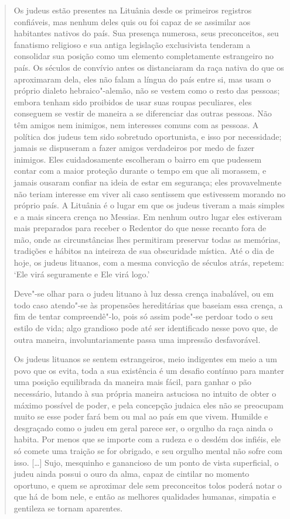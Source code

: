 \begin{quote}
Os judeus estão presentes na Lituânia desde os primeiros registros
confiáveis, mas nenhum deles quis ou foi capaz de se assimilar aos
habitantes nativos do país. Sua presença numerosa, seus preconceitos,
seu fanatismo religioso e sua antiga legislação exclusivista tenderam a
consolidar sua posição como um elemento completamente estrangeiro no
país. Os séculos de convívio antes os distanciaram da raça nativa do que
os aproximaram dela, eles não falam a língua do país entre si, mas usam
o próprio dialeto hebraico"-alemão, não se vestem como o resto das
pessoas; embora tenham sido proibidos de usar suas roupas peculiares,
eles conseguem se vestir de maneira a se diferenciar das outras pessoas.
Não têm amigos nem inimigos, nem interesses comuns com as pessoas. A
política dos judeus tem sido sobretudo oportunista, e isso por
necessidade; jamais se dispuseram a fazer amigos verdadeiros por medo de
fazer inimigos. Eles cuidadosamente escolheram o bairro em que pudessem
contar com a maior proteção durante o tempo em que ali morassem, e
jamais ousaram confiar na ideia de estar em segurança; eles
provavelmente não teriam interesse em viver ali caso sentissem que
estivessem morando no próprio país. A Lituânia é o lugar em que os
judeus tiveram a mais simples e a mais sincera crença no Messias. Em
nenhum outro lugar eles estiveram mais preparados para receber o
Redentor do que nesse recanto fora de mão, onde as circunstâncias lhes
permitiram preservar todas as memórias, tradições e hábitos na inteireza
de sua obscuridade mística. Até o dia de hoje, os judeus lituanos, com a
mesma convicção de séculos atrás, repetem: `Ele virá seguramente e Ele
virá logo.'

Deve"-se olhar para o judeu lituano à luz dessa crença inabalável, ou em
todo caso atendo"-se às propensões hereditárias que baseiam essa crença,
a fim de tentar compreendê"-lo, pois só assim pode"-se perdoar todo o seu
estilo de vida; algo grandioso pode até ser identificado nesse povo que,
de outra maneira, involuntariamente passa uma impressão desfavorável.

Os judeus lituanos se sentem estrangeiros, meio indigentes em meio a um
povo que os evita, toda a sua existência é um desafio contínuo para
manter uma posição equilibrada da maneira mais fácil, para ganhar o pão
necessário, lutando à sua própria maneira astuciosa no intuito de obter
o máximo possível de poder, e pela concepção judaica eles não se
preocupam muito se esse poder fará bem ou mal ao país em que vivem.
Humilde e desgraçado como o judeu em geral parece ser, o orgulho da raça
ainda o habita. Por menos que se importe com a rudeza e o desdém dos
infiéis, ele só comete uma traição se for obrigado, e seu orgulho mental
não sofre com isso. [\ldots{}] Sujo, mesquinho e ganancioso de um ponto de
vista superficial, o judeu ainda possui o ouro da alma, capaz de
cintilar no momento oportuno, e quem se aproximar dele sem preconceitos
tolos poderá notar o que há de bom nele, e então as melhores qualidades
humanas, simpatia e gentileza se tornam aparentes.


\end{quote}
